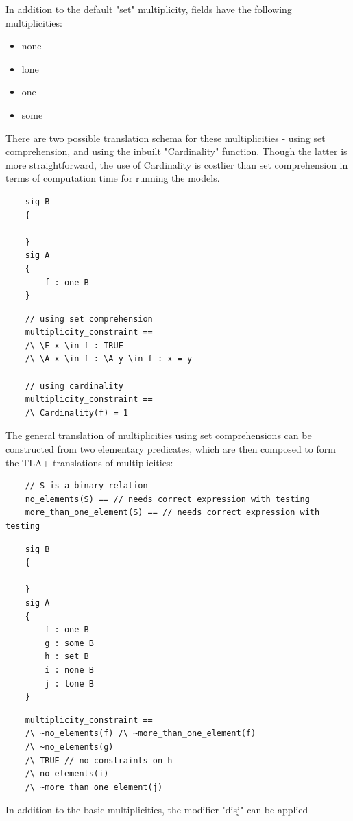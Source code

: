 In addition to the default "set" multiplicity, fields have the following multiplicities:

\begin{itemize}
	\item none
	\item lone
	\item one
	\item some
\end{itemize}

There are two possible translation schema for these multiplicities - using set comprehension, and using the inbuilt "Cardinality" function. Though the latter is more straightforward, the use of Cardinality is costlier than set comprehension in terms of computation time for running the models.

\begin{verbatim}
	sig B
	{

	}
	sig A
	{
		f : one B
	}
\end{verbatim}

\begin{verbatim}
	// using set comprehension
	multiplicity_constraint == 
	/\ \E x \in f : TRUE
	/\ \A x \in f : \A y \in f : x = y

	// using cardinality
	multiplicity_constraint ==
	/\ Cardinality(f) = 1
\end{verbatim}

The general translation of multiplicities using set comprehensions can be constructed from two elementary predicates, which are then composed to form the TLA+ translations of multiplicities:

\begin{verbatim}
	// S is a binary relation
	no_elements(S) == // needs correct expression with testing
	more_than_one_element(S) == // needs correct expression with testing
\end{verbatim}

\begin{verbatim}
	sig B
	{

	}
	sig A
	{
		f : one B
		g : some B
		h : set B
		i : none B
		j : lone B
	}
\end{verbatim}

\begin{verbatim}
	multiplicity_constraint == 
	/\ ~no_elements(f) /\ ~more_than_one_element(f)
	/\ ~no_elements(g)
	/\ TRUE // no constraints on h
	/\ no_elements(i)
	/\ ~more_than_one_element(j)
\end{verbatim}

In addition to the basic multiplicities, the modifier "disj" can be applied


